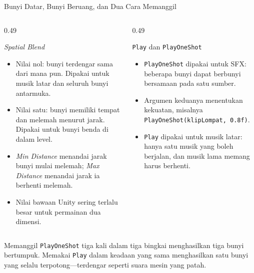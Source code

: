 \documentclass[aspectratio=169,10pt]{beamer}
\begin{document}
\begin{frame}{Bunyi Datar, Bunyi Beruang, dan Dua Cara Memanggil}
\begin{columns}[T,onlytextwidth]
  \begin{column}{0.49\textwidth}
    \begin{block}{\emph{Spatial Blend}}
      \begin{itemize}
        \item Nilai nol: bunyi terdengar sama dari mana pun. Dipakai untuk
              musik latar dan seluruh bunyi antarmuka.
        \item Nilai satu: bunyi memiliki tempat dan melemah menurut jarak.
              Dipakai untuk bunyi benda di dalam level.
        \item \emph{Min Distance} menandai jarak bunyi mulai melemah;
              \emph{Max Distance} menandai jarak ia berhenti melemah.
        \item Nilai bawaan Unity sering terlalu besar untuk permainan dua
              dimensi.
      \end{itemize}
    \end{block}
  \end{column}
  \begin{column}{0.49\textwidth}
    \begin{block}{\texttt{Play} dan \texttt{PlayOneShot}}
      \begin{itemize}
        \item \texttt{PlayOneShot} dipakai untuk SFX: beberapa bunyi dapat
              berbunyi bersamaan pada satu sumber.
        \item Argumen keduanya menentukan kekuatan, misalnya
              \texttt{PlayOneShot(klipLompat, 0.8f)}.
        \item \texttt{Play} dipakai untuk musik latar: hanya satu musik yang
              boleh berjalan, dan musik lama memang harus berhenti.
      \end{itemize}
    \end{block}
  \end{column}
\end{columns}
\vspace{-0.06cm}
\begin{kotak}
Memanggil \texttt{PlayOneShot} tiga kali dalam tiga bingkai menghasilkan tiga
bunyi bertumpuk. Memakai \texttt{Play} dalam keadaan yang sama menghasilkan
satu bunyi yang selalu terpotong---terdengar seperti suara mesin yang patah.
\end{kotak}
\end{frame}
\end{document}
